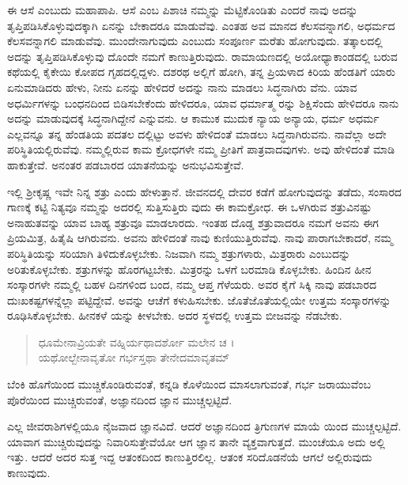 ಈ ಆಸೆ ಎಂಬುದು ಮಹಾಪಾಪಿ. ಆಸೆ ಎಂಬ ಪಿಶಾಚಿ ನಮ್ಮನ್ನು ಮೆಟ್ಟಿಕೊಂಡಿತು ಎಂದರೆ ನಾವು ಅದನ್ನು ತೃಪ್ತಿಪಡಿಸಿಕೊಳ್ಳುವುದಕ್ಕಾಗಿ ಏನನ್ನು ಬೇಕಾದರೂ ಮಾಡುವೆವು. ಎಂತಹ ಅವ ಮಾನದ ಕೆಲಸವನ್ನಾಗಲಿ, ಅಧರ್ಮದ ಕೆಲಸವನ್ನಾಗಲಿ ಮಾಡುವೆವು. ಮುಂದೇನಾಗುವುದು ಎಂಬುದು ಸಂಪೂರ್ಣ ಮರೆತು ಹೋಗುವುದು. ತತ್ಕಾಲದಲ್ಲಿ ಅದನ್ನು ತೃಪ್ತಿಪಡಿಸಿಕೊಳ್ಳುವು ದೊಂದೇ ನಮಗೆ ಕಾಣುತ್ತಿರುವುದು. ರಾಮಾಯಣದಲ್ಲಿ ಅಯೋಧ್ಯಾಕಾಂಡದಲ್ಲಿ ಬರುವ ಕಥೆಯಲ್ಲಿ ಕೈಕೇಯಿ ಕೋಪದ ಗೃಹದಲ್ಲಿದ್ದಳು. ದಶರಥ ಅಲ್ಲಿಗೆ ಹೋಗಿ, ತನ್ನ ಪ್ರಿಯಳಾದ ಕಿರಿಯ ಹೆಂಡತಿಗೆ ಯಾರು ಏನುಮಾಡಿದರು ಹೇಳು, ನೀನು ಏನನ್ನು ಹೇಳಿದರೆ ಅದನ್ನು ನಾನು ಮಾಡಲು ಸಿದ್ಧನಾಗಿರು ವೆನು. ಯಾವ ಅಧರ್ಮಿಗಳನ್ನು ಬಂಧನದಿಂದ ಬಿಡಿಸಬೇಕೆಂದು ಹೇಳಿದರೂ, ಯಾವ ಧರ್ಮಾತ್ಮ ರನ್ನು ಶಿಕ್ಷಿಸೆಂದು ಹೇಳಿದರೂ ನಾನು ಅದನ್ನು ಮಾಡುವುದಕ್ಕೆ ಸಿದ್ಧನಾಗಿದ್ದೇನೆ ಎನ್ನುವನು. ಆ ಕಾಮುಕ ಮುದುಕ ನ್ಯಾಯ ಅನ್ಯಾಯ, ಧರ್ಮ ಅಧರ್ಮ ಎಲ್ಲವನ್ನೂ ತನ್ನ ಹೆಂಡತಿಯ ಪದತಲ ದಲ್ಲಿಟ್ಟು ಅವಳು ಹೇಳಿದಂತೆ ಮಾಡಲು ಸಿದ್ಧನಾಗಿರುವನು. ನಾವೆಲ್ಲಾ ಅದೇ ಪರಿಸ್ಥಿತಿಯಲ್ಲಿರುವೆವು. ನಮ್ಮಲ್ಲಿರುವ ಕಾಮ ಕ್ರೋಧಗಳೇ ನಮ್ಮ ಪ್ರೀತಿಗೆ ಪಾತ್ರವಾದವುಗಳು. ಅವು ಹೇಳಿದಂತೆ ಮಾಡಿ ಹಾಕುತ್ತೇವೆ. ಅನಂತರ ಪಡಬಾರದ ಯಾತನೆಯನ್ನು ಅನುಭವಿಸುತ್ತೇವೆ.

ಇಲ್ಲಿ ಶ್ರೀಕೃಷ್ಣ ಇವೇ ನಿನ್ನ ಶತ್ರು ಎಂದು ಹೇಳುತ್ತಾನೆ. ಜೀವನದಲ್ಲಿ ದೇವರ ಕಡೆಗೆ ಹೋಗುವುದನ್ನು ತಡೆದು, ಸಂಸಾರದ ಗಾಣಕ್ಕೆ ಕಟ್ಟಿ ನಿತ್ಯವೂ ನಮ್ಮನ್ನು ಅದರಲ್ಲಿ ಸುತ್ತಿಸುತ್ತಿರು ವುದು ಈ ಕಾಮಕ್ರೋಧ. ಈ ಒಳಗಿರುವ ಶತ್ರುವಿನಷ್ಟು ಅನಾಹುತವನ್ನು ಯಾವ ಬಾಹ್ಯ ಶತ್ರುವೂ ಮಾಡಲಾರದು. ಇಂತಹ ದೊಡ್ಡ ಶತ್ರುವಾದರೂ ನಮಗೆ ಅವನು ಈಗ ಪ್ರಿಯಮಿತ್ರ, ಹಿತೈಷಿ ಆಗಿರುವನು. ಅವನು ಹೇಳಿದಂತೆ ನಾವು ಕುಣಿಯುತ್ತಿರುವೆವು. ನಾವು ಪಾರಾಗಬೇಕಾದರೆ, ನಮ್ಮ ಪರಿಸ್ಥಿತಿಯನ್ನು ಸರಿಯಾಗಿ ತಿಳಿದುಕೊಳ್ಳಬೇಕು. ನಿಜವಾಗಿ ನಮ್ಮ ಶತ್ರುಗಳಾರು, ಮಿತ್ರರಾರು ಎಂಬುದನ್ನು ಅರಿತುಕೊಳ್ಳಬೇಕು. ಶತ್ರುಗಳನ್ನು ಹೊರಗಟ್ಟಬೇಕು. ಮಿತ್ರರನ್ನು ಒಳಗೆ ಬರಮಾಡಿ ಕೊಳ್ಳಬೇಕು. ಹಿಂದಿನ ಹೀನ ಸಂಸ್ಕಾರಗಳೇ ನಮ್ಮಲ್ಲಿ ಬಹಳ ದಿನಗಳಿಂದ ಬಂದ, ನಮ್ಮ ಆಪ್ತ ಗೆಳೆಯರು. ಅವರ ಕೈಗೆ ಸಿಕ್ಕಿ ನಾವು ಪಡಬಾರದ ದುಃಖಕಷ್ಟಗಳನ್ನೆಲ್ಲಾ ಪಟ್ಟಿದ್ದೇವೆ. ಅವನ್ನು ಆಚೆಗೆ ಕಳುಹಿಸಬೇಕು. ಜೊತೆಜೊತೆಯಲ್ಲಿಯೇ ಉತ್ತಮ ಸಂಸ್ಕಾರಗಳನ್ನು ರೂಢಿಸಿಕೊಳ್ಳಬೇಕು. ಹೀನಕಳೆ ಯನ್ನು ಕೀಳಬೇಕು. ಅದರ ಸ್ಥಳದಲ್ಲಿ ಉತ್ತಮ ಬೀಜವನ್ನು ನೆಡಬೇಕು.

\begin{verse}
ಧೂಮೇನಾವ್ರಿಯತೇ ವಹ್ನಿರ್ಯಥಾದರ್ಶೋ ಮಲೇನ ಚ ।\\ಯಥೋಲ್ಬೇನಾವೃತೋ ಗರ್ಭಸ್ತಥಾ ತೇನೇದಮಾವೃತಮ್ 
\end{verse}

{\small ಬೆಂಕಿ ಹೊಗೆಯಿಂದ ಮುಚ್ಚಿಕೊಂಡಿರುವಂತೆ, ಕನ್ನಡಿ ಕೊಳೆಯಿಂದ ಮಾಸಲಾಗುವಂತೆ, ಗರ್ಭ ಜರಾಯುವೆಂಬ ಪೊರೆಯಿಂದ ಮುಚ್ಚಿರುವಂತೆ, ಅಜ್ಞಾನದಿಂದ ಜ್ಞಾನ ಮುಚ್ಚಲ್ಪಟ್ಟಿದೆ.}

ಎಲ್ಲ ಜೀವರಾಶಿಗಳಲ್ಲಿಯೂ ನೈಜವಾದ ಜ್ಞಾನವಿದೆ. ಆದರೆ ಅಜ್ಞಾನದಿಂದ ತ್ರಿಗುಣಗಳ ಮಾಯೆ ಯಿಂದ ಮುಚ್ಚಲ್ಪಟ್ಟಿದೆ. ಯಾವಾಗ ಮುಚ್ಚಿರುವುದನ್ನು ನಿವಾರಿಸುತ್ತೇವೆಯೋ ಆಗ ಜ್ಞಾನ ತಾನೇ ವ್ಯಕ್ತವಾಗುತ್ತದೆ. ಮುಂಚೆಯೂ ಅದು ಅಲ್ಲಿ ಇತ್ತು. ಆದರೆ ಅದರ ಸುತ್ತ ಇದ್ದ ಆತಂಕದಿಂದ ಕಾಣುತ್ತಿರಲಿಲ್ಲ. ಆತಂಕ ಸರಿದೊಡನೆಯೆ ಆಗಲೆ ಅಲ್ಲಿರುವುದು ಕಾಣುವುದು.


